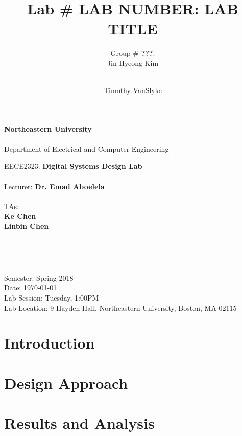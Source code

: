 \documentclass[12pt, letterpaper]{article}
\title{Lab \# LAB NUMBER: \textbf{LAB TITLE}}
\author{Group \# \textbf{\color{red}???}:\\ Jin Hyeong Kim \and\\ Timothy VanSlyke}
\begin{document}
\begin{titlepage}
	\begin{center}
		{\Large
			\textbf{Northeastern University}\\
			~\\
			Department of Electrical and Computer Engineering\\ 
		}

		\vfill

		{\large
			EECE2323: \textbf{Digital Systems Design Lab}\\
			~\\
			Lecturer: \textbf{Dr. Emad Aboelela}\\
			~\\
			TAs:\\
			\textbf{Ke Chen}\\
			\textbf{Linbin Chen}\\
		}
	
		\vfill

		{\Large \thetitle}\\
	
		\vfill

		{\large \theauthor}\\

		\vfill

		{\large
			Semester: Spring 2018\\
			Date: \today\\
			Lab Session: Tuesday, 1:00PM\\ 
			Lab Location: 9 Hayden Hall, Northeastern University, Boston, MA 02115\\
		}

	\end{center}
\end{titlepage}
\tableofcontents


\newpage
\section{Introduction}




\newpage
\section{Design Approach}




\newpage
\section{Results and Analysis}
\end{document}
